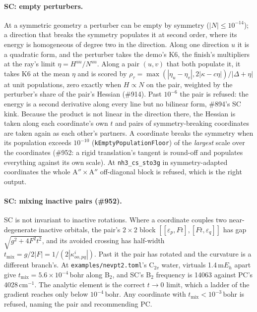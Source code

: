 \documentclass[11pt]{article}
\newcommand{\code}[1]{\texttt{#1}}
\newcommand{\eps}{\varepsilon}
\begin{document}
\paragraph{SC: empty perturbers.} At a symmetric geometry a perturber can be
empty by symmetry ($|N| \le 10^{-14}$); a direction that breaks the symmetry
populates it at second order, where its energy is homogeneous of degree two
in the direction. Along one direction $u$ it is a quadratic form, and the
perturber takes the demo's K6, the finish's multipliers at the ray's limit
$\eta = H^{uu}/N^{uu}$. Along a pair $(u, v)$ that both populate it, it
takes K6 at the mean $\eta$ and is scored by
$\rho_\tau = \max(|\eta_u - \eta_v|, 2|\kappa - c\eta|)/|\Delta + \eta|$ at
unit populations, zero exactly when $H \propto N$ on the pair, weighted by
the perturber's share of the pair's Hessian (\#914). Past $10^{-6}$ the pair
is refused: the energy is a second derivative along every line but no
bilinear form, \#894's SC kink. Because the product is not linear in the
direction there, the Hessian is taken along each coordinate's own $t$ and
pairs of symmetry-breaking coordinates are taken again as each other's
partners. A coordinate breaks the symmetry when its population exceeds
$10^{-10}$ (\code{kEmptyPopulationFloor}) of the \emph{largest} scale over the
coordinates (\#952: a rigid translation's tangent is round-off and populates
everything against its own scale). At \code{nh3\_cs\_sto3g} in symmetry-adapted
coordinates the whole A$''\times$A$''$ off-diagonal block is refused, which is
the right output.

\paragraph{SC: mixing inactive pairs (\#952).} SC is not invariant to
inactive rotations. Where a coordinate couples two near-degenerate inactive
orbitals, the pair's $2\times2$ block $[[\eps_p, Ft], [Ft, \eps_q]]$ has
gap $\sqrt{g^2 + 4F^2t^2}$, and its avoided crossing has half-width
$t_{\mathrm{mix}} = g/2|F| = 1/(2|\kappa^i_{oo,pq}|)$. Past it the pair has
rotated and the curvature is a different branch's. At \code{examples/nevpt2.toml}'s
C$_{2v}$ water, virtuals 1.4\,m$E_h$ apart give $t_{\mathrm{mix}} =
5.6\times10^{-4}$\,bohr along B$_2$, and SC's B$_2$ frequency is 14063
against PC's 4028\,cm$^{-1}$. The analytic element is the correct $t\to0$
limit, which a ladder of the gradient reaches only below $10^{-4}$\,bohr.
Any coordinate with $t_{\mathrm{mix}} < 10^{-3}$\,bohr is refused, naming the
pair and recommending PC.
\end{document}
